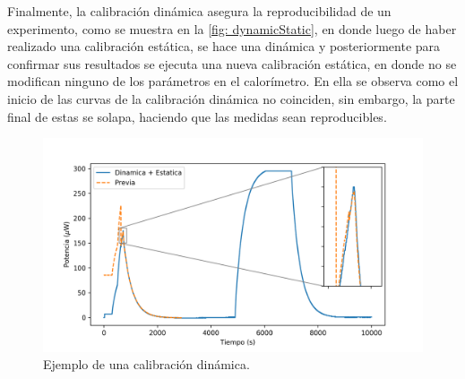 	Finalmente, la calibración dinámica asegura la reproducibilidad de un experimento, como se muestra en la \autoref{fig: dynamicStatic}, en donde luego de haber realizado una calibración estática, se hace una dinámica y posteriormente para confirmar sus resultados se ejecuta una nueva calibración estática, en donde no se modifican ninguno de los parámetros en el calorímetro. En ella se observa como el inicio de las curvas de la calibración dinámica no coinciden, sin embargo, la parte final de estas se solapa, haciendo que las medidas sean reproducibles.
	
	\begin{figure}[h]
		\centering
		\includegraphics[width=\linewidth]{../Data/ElectricalCalibrations/Both}
		\caption{Ejemplo de una calibración dinámica.}
		\label{fig: dynamicStatic}
	\end{figure}